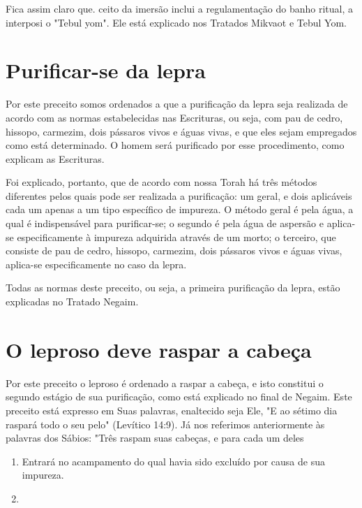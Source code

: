 \begin{itemize}
\begin{enumrate}
\begin{itemize}
\begin{itemize}
Fica assim claro que. ceito da imersão inclui a
regulamenta­ção do banho ritual, a interposi o "Tebul yom". Ele está
explicado nos Tratados Mikvaot e Tebul Yom.

\section{Purificar-se da lepra}

Por este preceito somos ordenados a que a purificação da lepra seja
realizada de acordo com as normas estabelecidas nas Escrituras, ou seja,
com pau de cedro, hissopo, carmezim, dois pássaros vivos e águas vivas,
e que eles sejam empregados como está determinado. O homem será
purificado por esse procedimento, como explicam as Escrituras.

Foi explicado, portanto, que de acordo com nossa Torah há três mé­todos
diferentes pelos quais pode ser realizada a purificação: um geral, e
dois aplicáveis cada um apenas a um tipo específico de impureza. O
método geral é pela água, a qual é indispensável para purificar-se; o
segundo é pela água de aspersão e aplica-se especificamente à impureza
adquirida através de um mor­to; o terceiro, que consiste de pau de
cedro, hissopo, carmezim, dois pássaros vivos e águas vivas, aplica-se
especificamente no caso da lepra.

Todas as normas deste preceito, ou seja, a primeira purificação da
lepra, estão explicadas no Tratado Negaim.

\section{O leproso deve raspar a cabeça}

Por este preceito o leproso é ordenado a raspar a cabeça, e isto
cons­titui o segundo estágio de sua purificação, como está explicado no
final de Ne­gaim. Este preceito está expresso em Suas palavras,
enaltecido seja Ele, "E ao sétimo dia raspará todo o seu pelo" (Levítico
14:9). Já nos referimos anterior­mente às palavras dos Sábios: "Três
raspam suas cabeças, e para cada um deles


\begin{enumerate}
\def\labelenumi{\arabic{enumi}.}
\setcounter{enumi}{150}
\item
 
 Entrará no acampamento do qual havia sido excluído por causa de sua
 impureza.
 
\item
 

\end{enumerate}
\end{itemize}
\end{itemize}
\end{enumrate}
\end{itemize}
